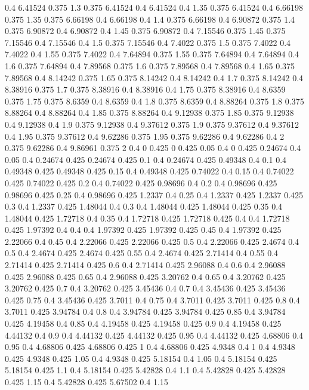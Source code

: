 0.4 6.41524
0.375 1.3
0.375 6.41524
0.4 6.41524
0.4 1.35
0.375 6.41524
0.4 6.66198
0.375 1.35
0.375 6.66198
0.4 6.66198
0.4 1.4
0.375 6.66198
0.4 6.90872
0.375 1.4
0.375 6.90872
0.4 6.90872
0.4 1.45
0.375 6.90872
0.4 7.15546
0.375 1.45
0.375 7.15546
0.4 7.15546
0.4 1.5
0.375 7.15546
0.4 7.4022
0.375 1.5
0.375 7.4022
0.4 7.4022
0.4 1.55
0.375 7.4022
0.4 7.64894
0.375 1.55
0.375 7.64894
0.4 7.64894
0.4 1.6
0.375 7.64894
0.4 7.89568
0.375 1.6
0.375 7.89568
0.4 7.89568
0.4 1.65
0.375 7.89568
0.4 8.14242
0.375 1.65
0.375 8.14242
0.4 8.14242
0.4 1.7
0.375 8.14242
0.4 8.38916
0.375 1.7
0.375 8.38916
0.4 8.38916
0.4 1.75
0.375 8.38916
0.4 8.6359
0.375 1.75
0.375 8.6359
0.4 8.6359
0.4 1.8
0.375 8.6359
0.4 8.88264
0.375 1.8
0.375 8.88264
0.4 8.88264
0.4 1.85
0.375 8.88264
0.4 9.12938
0.375 1.85
0.375 9.12938
0.4 9.12938
0.4 1.9
0.375 9.12938
0.4 9.37612
0.375 1.9
0.375 9.37612
0.4 9.37612
0.4 1.95
0.375 9.37612
0.4 9.62286
0.375 1.95
0.375 9.62286
0.4 9.62286
0.4 2
0.375 9.62286
0.4 9.86961
0.375 2
0.4 0
0.425 0
0.425 0.05
0.4 0
0.425 0.24674
0.4 0.05
0.4 0.24674
0.425 0.24674
0.425 0.1
0.4 0.24674
0.425 0.49348
0.4 0.1
0.4 0.49348
0.425 0.49348
0.425 0.15
0.4 0.49348
0.425 0.74022
0.4 0.15
0.4 0.74022
0.425 0.74022
0.425 0.2
0.4 0.74022
0.425 0.98696
0.4 0.2
0.4 0.98696
0.425 0.98696
0.425 0.25
0.4 0.98696
0.425 1.2337
0.4 0.25
0.4 1.2337
0.425 1.2337
0.425 0.3
0.4 1.2337
0.425 1.48044
0.4 0.3
0.4 1.48044
0.425 1.48044
0.425 0.35
0.4 1.48044
0.425 1.72718
0.4 0.35
0.4 1.72718
0.425 1.72718
0.425 0.4
0.4 1.72718
0.425 1.97392
0.4 0.4
0.4 1.97392
0.425 1.97392
0.425 0.45
0.4 1.97392
0.425 2.22066
0.4 0.45
0.4 2.22066
0.425 2.22066
0.425 0.5
0.4 2.22066
0.425 2.4674
0.4 0.5
0.4 2.4674
0.425 2.4674
0.425 0.55
0.4 2.4674
0.425 2.71414
0.4 0.55
0.4 2.71414
0.425 2.71414
0.425 0.6
0.4 2.71414
0.425 2.96088
0.4 0.6
0.4 2.96088
0.425 2.96088
0.425 0.65
0.4 2.96088
0.425 3.20762
0.4 0.65
0.4 3.20762
0.425 3.20762
0.425 0.7
0.4 3.20762
0.425 3.45436
0.4 0.7
0.4 3.45436
0.425 3.45436
0.425 0.75
0.4 3.45436
0.425 3.7011
0.4 0.75
0.4 3.7011
0.425 3.7011
0.425 0.8
0.4 3.7011
0.425 3.94784
0.4 0.8
0.4 3.94784
0.425 3.94784
0.425 0.85
0.4 3.94784
0.425 4.19458
0.4 0.85
0.4 4.19458
0.425 4.19458
0.425 0.9
0.4 4.19458
0.425 4.44132
0.4 0.9
0.4 4.44132
0.425 4.44132
0.425 0.95
0.4 4.44132
0.425 4.68806
0.4 0.95
0.4 4.68806
0.425 4.68806
0.425 1
0.4 4.68806
0.425 4.9348
0.4 1
0.4 4.9348
0.425 4.9348
0.425 1.05
0.4 4.9348
0.425 5.18154
0.4 1.05
0.4 5.18154
0.425 5.18154
0.425 1.1
0.4 5.18154
0.425 5.42828
0.4 1.1
0.4 5.42828
0.425 5.42828
0.425 1.15
0.4 5.42828
0.425 5.67502
0.4 1.15
